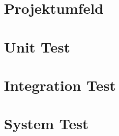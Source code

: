 \documentclass[a4paper,bibtotoc,oneside]{scrbook}
\begin{document}
\chapter{Projektumfeld}


\chapter{Unit Test}






\chapter{Integration Test}




\chapter{System Test}
\end{document}
